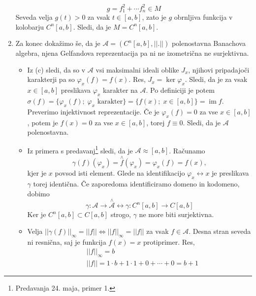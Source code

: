 \documentclass[a4paper, 12pt]{article}
\DeclareMathOperator{\im}{im}
\newcommand{\homeo}{\approx}
\newcommand{\idtfy}{\longleftrightarrow}
\begin{document}
\begin{enumerate}[label=(\alph*)]
	\[
	g = f_1^2 + \cdots f_n^2 \in M
	\]
	Seveda velja $g(t) > 0$ za vsak $t \in [a, b]$, zato je $g$ obrnljiva funkcija v kolobarju $C^n[a, b]$. Sledi, da je $M = C^n[a, b]$.
	\item Za konec dokažimo še, da je $\mathcal{A} = (C^n[a, b], ||.||)$ polenostavna Banachova algebra, njena Gelfandova reprezentacija pa ni ne izometrična ne surjektivna.
	\begin{itemize}
		\item Iz (c) sledi, da so v $\mathcal{A}$ vsi maksimalni ideali oblike $J_x$, njihovi pripadajoči karakterji pa so $\varphi_x(f) = f(x)$. Res, $J_x = \ker\varphi_x$. Sledi, da je za vsak $x \in [a, b]$ preslikava $\varphi_x$ karakter na $\mathcal{A}$. Po definiciji je potem $\sigma(f) = \lbrace \varphi_x(f) ;\; \varphi_x \text{ karakter}\rbrace = \lbrace f(x) ;\; x \in [a, b] \rbrace = \im f$. Preverimo injektivnost reprezentacije. Če je $\varphi_x(f) = 0$ za vse $x \in [a, b]$, potem je $f(x) = 0$ za vse $x \in [a, b]$, torej $f \equiv 0$. Sledi, da je $\mathcal{A}$ polenostavna.
		\item Iz primera s predavanj\footnote{Predavanja 24. maja, primer 1.} sledi, da je $\mathcal{A} \homeo [a, b]$. Računamo
		\[
		\gamma(f)(\varphi_x) = \overset{\wedge}{f}(\varphi_x) = \varphi_x(f) = f(x),
		\]
		kjer je $x$ povsod isti element. Glede na identifikacijo $\varphi_x \idtfy x$ je preslikava $\gamma$ torej identična. Če zaporedoma identificiramo domeno in kodomeno, dobimo
		\[
		\gamma\colon \mathcal{A} \to \overset{\wedge}{\mathcal{A}} \idtfy \gamma \colon C^n[a,b] \to C[a,b]
		\]
		Ker je $C^n[a, b] \subset C[a, b]$ strogo, $\gamma$ ne more biti surjektivna.
		\item Velja $|| \gamma(f) ||_\infty = || f || \iff || f ||_\infty = || f ||$ za vsak $f \in \mathcal{A}$. Desna stran seveda ni resnična, saj je funkcija $f(x) = x$ protiprimer. Res,
		\begin{align*}
		& || f ||_\infty = b \\
		& || f || = 1 \cdot b + 1 \cdot 1 + 0 + \cdots + 0 = b + 1
		\end{align*}
	\end{itemize}
\end{enumerate}
\end{document}
